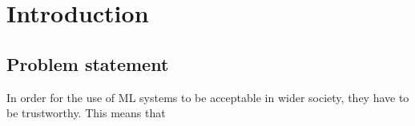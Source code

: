 \chapter{Introduction}\label{ch:introduction}
\section{Problem statement}
In order for the use of \ac{ML} systems to be acceptable in wider society,
they have to be trustworthy.
This means that
